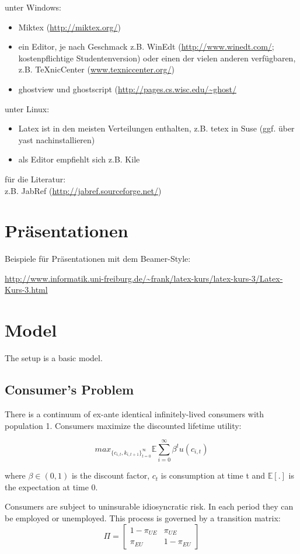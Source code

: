\documentclass[a4paper,12pt]{article}
\begin{document}
unter Windows:
\begin{itemize}
   \item Miktex (\url{http://miktex.org/})
   \item ein Editor, je nach Geschmack z.B. WinEdt (\url{http://www.winedt.com/}; kostenpflichtige Studentenversion) oder einen der vielen anderen verf\"ugbaren, z.B. TeXnicCenter (\url{www.texniccenter.org/})
   \item ghostview und ghostscript (\url{http://pages.cs.wisc.edu/~ghost/}
\end{itemize}
unter Linux:
\begin{itemize}
   \item Latex ist in den meisten Verteilungen enthalten, z.B. tetex in Suse (ggf. \"uber yast nachinstallieren)
   \item als Editor empfiehlt sich z.B. Kile
\end{itemize}
f\"ur die Literatur:\\
z.B. JabRef (\url{http://jabref.sourceforge.net/})


\section{Pr\"asentationen}

Beispiele f\"ur Pr\"asentationen mit dem Beamer-Style:

\url{http://www.informatik.uni-freiburg.de/~frank/latex-kurs/latex-kurs-3/Latex-Kurs-3.html}

\section{Model}

The setup is a basic \cite{aiyagari} model. 

\subsection{Consumer's Problem}

There is a continuum of ex-ante identical infinitely-lived consumers with population 1. Consumers maximize the discounted lifetime utility: 

\[ 
 max_{\{{ c_{i,t}, k_{i,t+1} }\}_{t = 0}^{\infty}} {\mathbb{E}} \sum_{i=0}^{\infty} \beta^{t}  u(c_{i,t}) 
 \]

where $\beta \in (0,1)$ is the discount factor, $ c_{t}$ is consumption at time t and $\mathbb{E[.]}$ is the expectation at time 0. 

Consumers are subject to uninsurable idiosyncratic risk. In each period they can be employed or unemployed. This process is governed by a transition matrix:
\[ \Pi = \begin{bmatrix}
1-\pi_{UE} & \pi_{UE} \\
 \pi_{EU} & 1-\pi_{EU}
\end{bmatrix}
\]
\end{document}

